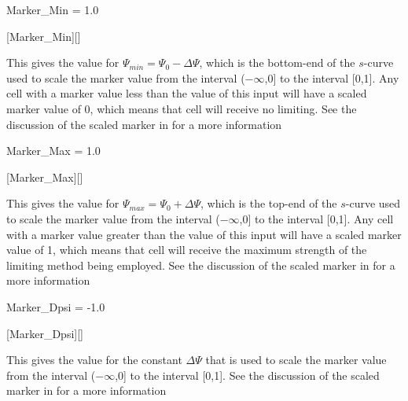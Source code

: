 
\begin{nmldescitem}
Marker_Min = 1.0
\end{nmldescitem}
[Marker\_Min][]

\begin{nmldescbody}
This gives the value for $\Psi_{min} = \Psi_0 - \Delta \Psi$,
which is the bottom-end of the $s$-curve used to scale
the marker value from the interval ($-\infty$,0] to the interval [0,1].
%
Any cell with a marker value less than the value of this input will have
a scaled marker value of 0, which means that cell will receive no limiting.
%
See the discussion of the scaled marker in 
for a more information
\end{nmldescbody}


\begin{nmldescitem}
Marker_Max = 1.0
\end{nmldescitem}
[Marker\_Max][]

\begin{nmldescbody}
This gives the value for $\Psi_{max} = \Psi_0 + \Delta \Psi$,
which is the top-end of the $s$-curve used to scale
the marker value from the interval ($-\infty$,0] to the interval [0,1].
%
Any cell with a marker value greater than the value of this input will have
a scaled marker value of 1, which means that cell will receive
the maximum strength of the limiting method being employed.
%
See the discussion of the scaled marker in 
for a more information
\end{nmldescbody}


\begin{nmldescitem}
Marker_Dpsi = -1.0
\end{nmldescitem}
[Marker\_Dpsi][]

\begin{nmldescbody}
This gives the value for the constant $\Delta\Psi$ that is used to scale
the marker value from the interval ($-\infty$,0] to the interval [0,1].
%
See the discussion of the scaled marker in 
for a more information
\end{nmldescbody}

